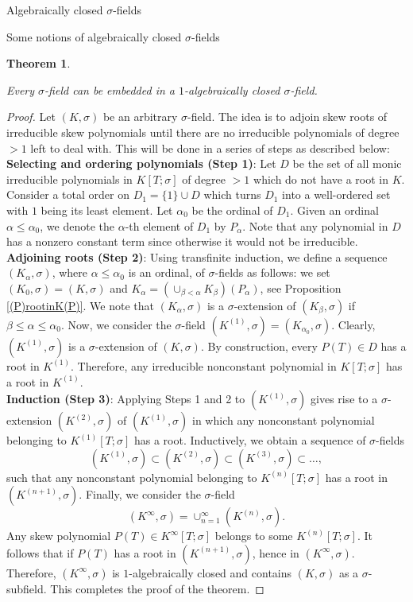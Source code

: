 \documentclass[11pt,a4paper]{article}
\theoremstyle{theorem}
\newtheorem{theorem}{Theorem}[section]
\numberwithin{equation}{section}
\newcommand{\s}{\sigma}
\begin{document}
\begin{section}{Algebraically closed $\s$-fields}
\begin{subsection}{Some notions of algebraically closed $\s$-fields}
		\begin{theorem}\label{(T)algebraicallyclosed}
			
			Every $\s$-field can be embedded in a $1$-algebraically closed $\s$-field. 
			
		\end{theorem}
		\begin{proof}
			Let $(K,\sigma)$ be an arbitrary $\sigma$-field. The idea is to adjoin skew roots of irreducible skew polynomials until there are no irreducible polynomials of degree $> 1$ left to deal with. This will be done in a series of steps as described below:\\
			\textbf{Selecting and ordering polynomials (Step 1)}:  Let $D$  be the set of all monic irreducible  polynomials in $K[T;\s]$ of degree $>1$ which do not have a root in $K$. 
			 Consider a total order on $D_1=\{1\}\cup D$ which turns $D_1$ into a well-ordered set with $1$ being its least element. Let $\alpha_0$ be the ordinal of $D_1$. Given an ordinal $\alpha\leq \alpha_0$, we denote the $\alpha$-th element of $D_1$ by $P_\alpha$.  Note that any polynomial in $D$ has a nonzero constant term since otherwise it would not be irreducible.\\ 
			 \textbf{Adjoining roots (Step 2)}: 
			 Using transfinite induction, we define a sequence $(K_\alpha,\s)$, where $\alpha\leq \alpha_0$ is an ordinal, of $\s$-fields as follows: we set $(K_0,\s)=(K,\s)$ and $K_\alpha=(\cup_{\beta<\alpha}K_\beta)(P_\alpha)$, see Proposition \ref{(P)rootinK(P)}. We note that   $(K_\alpha,\s)$ is a $\s$-extension of $(K_\beta,\s)$ if $\beta\leq \alpha\leq \alpha_0$. Now, we consider the $\s$-field $(K^{(1)},\s)=(K_{\alpha_0},\s)$. Clearly,  $(K^{(1)},\s)$ is   a $\s$-extension of $(K,\s)$.  By construction, every $P(T)\in D$ has a root in $K^{(1)}$. Therefore, any irreducible nonconstant polynomial in  $K[T;\s]$ has a root in  $K^{(1)}$. \\
			  \textbf{Induction (Step 3)}: 
			  Applying Steps 1 and 2 to $(K^{(1)},\s)$ gives rise to a   $\s$-extension   $(K^{(2)},\s)$ of  $(K^{(1)},\s)$ in which any nonconstant polynomial belonging to $K^{(1)}[T;\s]$ has a root. Inductively, we obtain a sequence of $\s$-fields 
			$$(K^{(1)},\s)\subset (K^{(2)},\s)\subset (K^{(3)},\s)\subset \dots,$$
			such that  any nonconstant polynomial belonging to  $K^{(n)}[T;\s]$  has a root in  $(K^{(n+1)},\s)$. Finally, we consider the $\s$-field
			$$(K^{\infty},\s)=\cup_{n=1}^\infty (K^{(n)},\s).$$
			Any  skew polynomial $P(T)\in K^{\infty}[T;\s]$ belongs to some 
			$K^{(n)}[T;\s]$. It follows that if $P(T)$  has a root in $(K^{(n+1)},\s)$, hence in $(K^{\infty},\s)$. Therefore, $(K^{\infty},\s)$ is $1$-algebraically closed and contains $(K,\s) $ as a $\s$-subfield. This completes the proof of the theorem. 
		\end{proof}


\end{subsection}
\end{section}
\end{document}
